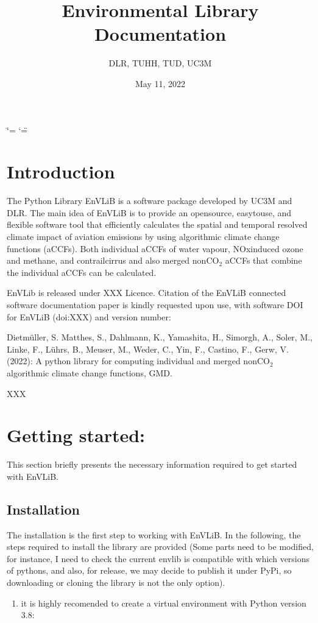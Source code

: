 \documentclass[a4paper,11pt,english]{sphinxmanual}
\title{Environmental Library Documentation}
\date{May 11, 2022}
\author{DLR, TUHH, TUD, UC3M}
\begin{document}
\ifdefined\shorthandoff
  \ifnum\catcode`\=\string=\active\shorthandoff{=}\fi
  \ifnum\catcode`\"=\active{}\fi
\fi

\pagestyle{empty}
\sphinxmaketitle
\pagestyle{plain}
\sphinxtableofcontents
\pagestyle{normal}
\label{\detokenize{index::doc}}



\chapter{Introduction}
\label{\detokenize{index:introduction}}
 The Python Library EnVLiB is a software package developed by UC3M and DLR. The main idea of EnVLiB is to provide an open\sphinxhyphen{}source, easy\sphinxhyphen{}to\sphinxhyphen{}use, and flexible software tool that efficiently calculates the spatial and temporal resolved climate impact of aviation emissions by using algorithmic climate change functions (aCCFs). Both individual aCCFs of water vapour, NOx\sphinxhyphen{}induced ozone and methane, and contrail\sphinxhyphen{}cirrus and also merged non\sphinxhyphen{}CO$_2$ aCCFs that combine the individual aCCFs can be calculated.

 EnVLib is released under XXX Licence. Citation of the EnVLiB connected software documentation paper is kindly requested upon use, with software DOI for EnVLiB (doi:XXX) and version number:

 Dietmüller, S. Matthes, S., Dahlmann, K., Yamashita, H., Simorgh, A., Soler, M., Linke, F., Lührs, B., Meuser, M., Weder, C., Yin, F., Castino, F., Gerw, V. (2022): A python library for computing individual and merged non\sphinxhyphen{}CO$_2$ algorithmic climate change functions, GMD.

 XXX


\chapter{Getting started:}
\label{\detokenize{index:getting-started}}
This section briefly presents the necessary information required to get started with EnVLiB.


\section{Installation}
\label{\detokenize{gStarted:installation}}\label{\detokenize{gStarted::doc}}
The installation is the first step to working with EnVLiB. In the following, the steps required to install the library are provided (Some parts need to be modified,
for instance, I need to check the current envlib is compatible with which versions of pythons, and also, for release, we may decide to publish it under
PyPi, so downloading or cloning the library is not the only option).
\begin{enumerate}
%
\setcounter{enumi}{-1}
\item {} 
it is highly recomended to create a virtual environment with Python version 3.8:

\end{enumerate}
\end{document}

